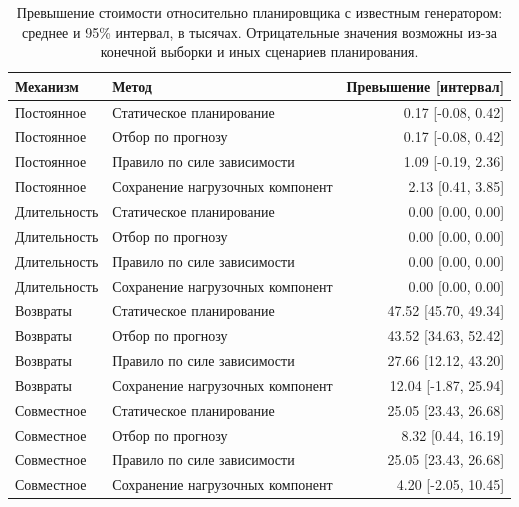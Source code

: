 \begin{table}[p]\caption{Превышение стоимости относительно планировщика с известным генератором: среднее и 95\% интервал, в тысячах. Отрицательные значения возможны из-за конечной выборки и иных сценариев планирования.}\centering\small\setlength{\tabcolsep}{3pt}\begin{tabular}{llr}\toprule
Механизм & Метод & Превышение [интервал]\\\midrule
Постоянное & Статическое планирование & 0.17 [-0.08, 0.42]\\
Постоянное & Отбор по прогнозу & 0.17 [-0.08, 0.42]\\
Постоянное & Правило по силе зависимости & 1.09 [-0.19, 2.36]\\
Постоянное & Сохранение нагрузочных компонент & 2.13 [0.41, 3.85]\\
Длительность & Статическое планирование & 0.00 [0.00, 0.00]\\
Длительность & Отбор по прогнозу & 0.00 [0.00, 0.00]\\
Длительность & Правило по силе зависимости & 0.00 [0.00, 0.00]\\
Длительность & Сохранение нагрузочных компонент & 0.00 [0.00, 0.00]\\
Возвраты & Статическое планирование & 47.52 [45.70, 49.34]\\
Возвраты & Отбор по прогнозу & 43.52 [34.63, 52.42]\\
Возвраты & Правило по силе зависимости & 27.66 [12.12, 43.20]\\
Возвраты & Сохранение нагрузочных компонент & 12.04 [-1.87, 25.94]\\
Совместное & Статическое планирование & 25.05 [23.43, 26.68]\\
Совместное & Отбор по прогнозу & 8.32 [0.44, 16.19]\\
Совместное & Правило по силе зависимости & 25.05 [23.43, 26.68]\\
Совместное & Сохранение нагрузочных компонент & 4.20 [-2.05, 10.45]\\
\bottomrule\end{tabular}\end{table}
